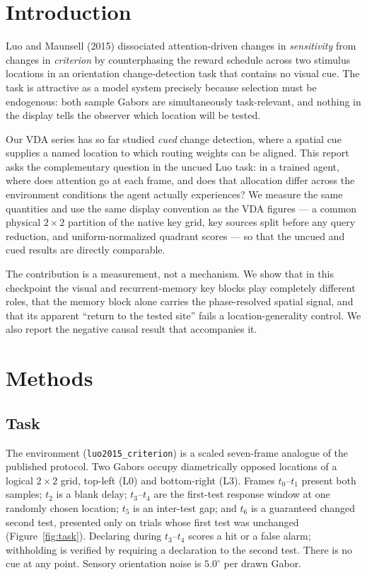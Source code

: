 \documentclass[10pt]{article}
\newcommand{\env}[1]{\texttt{#1}}
\begin{document}
\vspace{6pt}

\section{Introduction}

Luo and Maunsell (2015) dissociated attention-driven changes in \emph{sensitivity} from
changes in \emph{criterion} by counterphasing the reward schedule across two stimulus
locations in an orientation change-detection task that contains no visual cue. The task is
attractive as a model system precisely because selection must be endogenous: both sample
Gabors are simultaneously task-relevant, and nothing in the display tells the observer which
location will be tested.

Our VDA series has so far studied \emph{cued} change detection, where a spatial cue supplies
a named location to which routing weights can be aligned. This report asks the
complementary question in the uncued Luo task: in a trained agent, where does attention go
at each frame, and does that allocation differ across the environment conditions the agent
actually experiences? We measure the same quantities and use the same display convention as
the VDA figures --- a common physical $2\times2$ partition of the native key grid, key
sources split before any query reduction, and uniform-normalized quadrant scores --- so that
the uncued and cued results are directly comparable.

The contribution is a measurement, not a mechanism. We show that in this checkpoint the
visual and recurrent-memory key blocks play completely different roles, that the memory
block alone carries the phase-resolved spatial signal, and that its apparent
``return to the tested site'' fails a location-generality control. We also report the
negative causal result that accompanies it.

\section{Methods}

\subsection{Task}

The environment (\env{luo2015\_criterion}) is a scaled seven-frame analogue of the published
protocol. Two Gabors occupy diametrically opposed locations of a logical $2\times2$ grid,
top-left (L0) and bottom-right (L3). Frames $t_0$--$t_1$ present both samples; $t_2$ is a
blank delay; $t_3$--$t_4$ are the first-test response window at one randomly chosen location;
$t_5$ is an inter-test gap; and $t_6$ is a guaranteed changed second test, presented only on
trials whose first test was unchanged (Figure~\ref{fig:task}). Declaring during $t_3$--$t_4$
scores a hit or a false alarm; withholding is verified by requiring a declaration to the
second test. There is no cue at any point. Sensory orientation noise is
$5.0^\circ$ per drawn Gabor.
\end{document}

